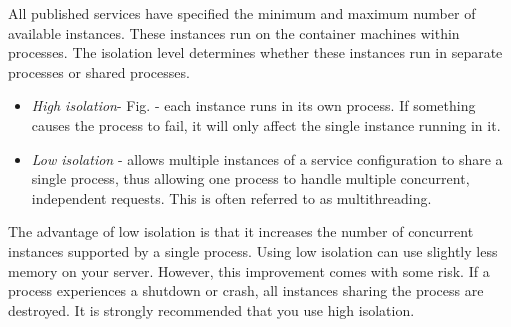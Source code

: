 \documentclass[12pt,a4paper]{article}
\begin{document}
All published services have specified the minimum and maximum number of available instances. These instances run on the container machines within processes. The isolation level determines whether these instances run in separate processes or shared processes. 
\begin{itemize}
\item \textit{High isolation}- Fig.  - each instance runs in its own process. If something causes the process to fail, it will only affect the single instance running in it.
\item \textit{Low isolation} - allows multiple instances of a service configuration to share a single process, thus allowing one process to handle multiple concurrent, independent requests. This is often referred to as multithreading.
\end{itemize} 

\begin{figure}[h!]
\centering
\begin{floatrow}
\end{floatrow}
\end{figure}

The advantage of low isolation is that it increases the number of concurrent instances supported by a single process. Using low isolation can use slightly less memory on your server. However, this improvement comes with some risk. If a process experiences a shutdown or crash, all instances sharing the process are destroyed. It is strongly recommended that you use high isolation.\cite{AG_docs}
\end{document}

